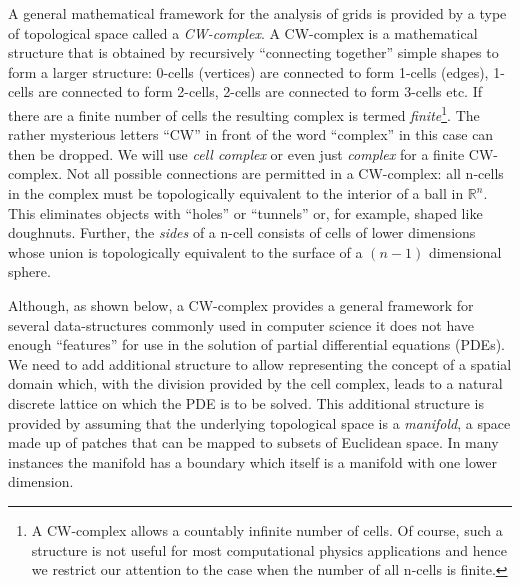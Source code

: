 \documentclass[11pt, reqno]{amsart}
\theoremstyle{definition}
\begin{document}

A general mathematical framework for the analysis of grids is provided
by a type of topological space called a \emph{CW-complex}. A
CW-complex is a mathematical structure that is obtained by recursively
``connecting together'' simple shapes to form a larger structure:
0-cells (vertices) are connected to form 1-cells (edges), 1-cells are
connected to form 2-cells, 2-cells are connected to form 3-cells
etc. If there are a finite number of cells the resulting complex is
termed \emph{finite}\footnote{A CW-complex allows a countably infinite
  number of cells. Of course, such a structure is not useful for most
  computational physics applications and hence we restrict our
  attention to the case when the number of all n-cells is
  finite.}. The rather mysterious letters ``CW'' in front of the word
``complex'' in this case can then be dropped. We will use \emph{cell
  complex} or even just \emph{complex} for a finite CW-complex. Not
all possible connections are permitted in a CW-complex: all n-cells in
the complex must be topologically equivalent to the interior of a ball
in $\mathbb{R}^n$. This eliminates objects with ``holes'' or
``tunnels'' or, for example, shaped like doughnuts. Further, the
\emph{sides} of a n-cell consists of cells of lower dimensions whose
union is topologically equivalent to the surface of a $(n-1)$
dimensional sphere.

Although, as shown below, a CW-complex provides a general framework
for several data-structures commonly used in computer science it does
not have enough ``features'' for use in the solution of partial
differential equations (PDEs). We need to add additional structure to
allow representing the concept of a spatial domain which, with the
division provided by the cell complex, leads to a natural discrete
lattice on which the PDE is to be solved. This additional structure is
provided by assuming that the underlying topological space is a
\emph{manifold}, a space made up of patches that can be mapped to
subsets of Euclidean space. In many instances the manifold has a
boundary which itself is a manifold with one lower dimension.


\end{document}
